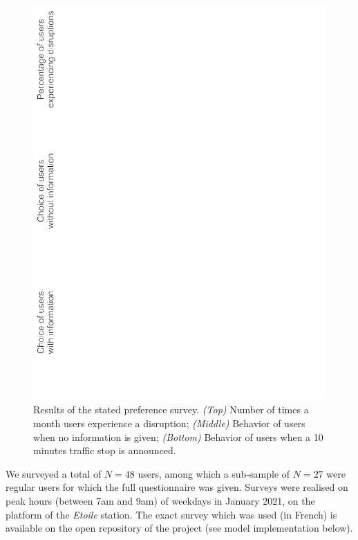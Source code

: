 \documentclass[3p,times,procedia]{elsarticle}
\begin{document}
\begin{figure}%
\centerline{\includegraphics[width=\linewidth]{figures/Fig1.png}}
\caption{Results of the stated preference survey. \textit{(Top)} Number of times a month users experience a disruption; \textit{(Middle)} Behavior of users when no information is given; \textit{(Bottom)} Behavior of users when a 10 minutes traffic stop is announced.\label{fig:fig1}}
\end{figure}

We surveyed a total of $N=48$ users, among which a sub-sample of $N=27$ were regular users for which the full questionnaire was given. Surveys were realised on peak hours (between 7am and 9am) of weekdays in January 2021, on the platform of the \emph{Etoile} station. The exact survey which was used (in French) is available on the open repository of the project (see model implementation below).
\end{document}
